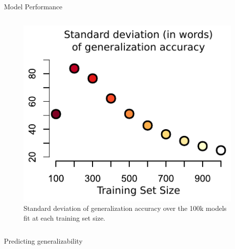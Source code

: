 \documentclass[final]{beamer}
\newlength{\twocolwid}
\begin{document}
\begin{frame}[t]
\begin{columns}[t]
\begin{column}{\twocolwid}
\begin{block}{Model Performance}
\begin{columns}[t]
  \begin{column}{0.38\linewidth}
    \begin{figure}[h]
      \centering
      \includegraphics[width=1.0\linewidth]{figures/generalization_std_colored_embedded_fonts.pdf}
      \caption{Standard deviation of generalization accuracy over the 100k models fit at each training set size.}
      \label{fig:generalization_std}
    \end{figure}

  \end{column}
\end{columns}

\end{block}

\begin{block}{Predicting generalizability}


\end{block}
\end{column}
\end{columns}
\end{frame}
\end{document}
